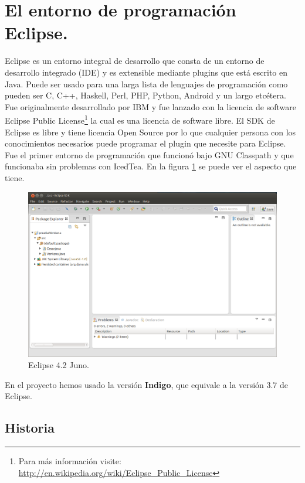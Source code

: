 \section{El entorno de programación Eclipse.}

Eclipse es un entorno integral de desarrollo que consta de un entorno de desarrollo integrado (IDE) y es extensible mediante plugins que está escrito en Java. Puede ser usado para una larga lista de lenguajes de programación como pueden ser C, C++, Haskell, Perl, PHP, Python, Android y un largo etcétera. Fue originalmente desarrollado por IBM y fue lanzado con la licencia de software Eclipse Public License\footnote{Para más información visite: \url{http://en.wikipedia.org/wiki/Eclipse\_Public\_License}} la cual es una licencia de software libre. El SDK de Eclipse es libre y tiene licencia Open Source por lo que cualquier persona con los conocimientos necesarios puede programar el plugin que necesite para Eclipse. Fue el primer entorno de programación que funcionó bajo GNU Classpath y que funcionaba sin problemas con IcedTea. En la figura \ref{fig:pantallaEclipse} se puede ver el aspecto que tiene.

\begin{figure}
  \centering
    \includegraphics[scale=0.5]{./ConocimientosPrevios/imagenes/pantallaEclipse.png}
  \caption{Eclipse 4.2 Juno.}
  \label{fig:pantallaEclipse}
\end{figure} 

En el proyecto hemos usado la versión \textbf{Indigo}, que equivale a la versión 3.7 de Eclipse.

\subsection{Historia}

